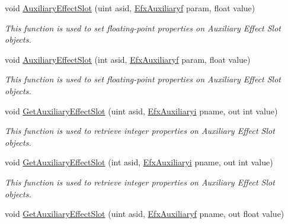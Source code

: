 \begin{DoxyCompactItemize}
void \hyperlink{class_open_t_k_1_1_audio_1_1_open_a_l_1_1_effects_extension_acb92406a943db3db93148e5473838d1c}{Auxiliary\-Effect\-Slot} (uint asid, \hyperlink{namespace_open_t_k_1_1_audio_1_1_open_a_l_ad4eb76e6214aa11619cd342b8ab6acbd}{Efx\-Auxiliaryf} param, float value)
\begin{DoxyCompactList}\small\item\em This function is used to set floating-\/point properties on Auxiliary Effect Slot objects.\end{DoxyCompactList}\item 
void \hyperlink{class_open_t_k_1_1_audio_1_1_open_a_l_1_1_effects_extension_ad5a5e5a6157209de8bed4682de7fd9a2}{Auxiliary\-Effect\-Slot} (int asid, \hyperlink{namespace_open_t_k_1_1_audio_1_1_open_a_l_ad4eb76e6214aa11619cd342b8ab6acbd}{Efx\-Auxiliaryf} param, float value)
\begin{DoxyCompactList}\small\item\em This function is used to set floating-\/point properties on Auxiliary Effect Slot objects.\end{DoxyCompactList}\item 
void \hyperlink{class_open_t_k_1_1_audio_1_1_open_a_l_1_1_effects_extension_ab2a55e2efd22acdee604fdc52fc36ff9}{Get\-Auxiliary\-Effect\-Slot} (uint asid, \hyperlink{namespace_open_t_k_1_1_audio_1_1_open_a_l_a94243a598006983d92449b374a5b60cc}{Efx\-Auxiliaryi} pname, out int value)
\begin{DoxyCompactList}\small\item\em This function is used to retrieve integer properties on Auxiliary Effect Slot objects.\end{DoxyCompactList}\item 
void \hyperlink{class_open_t_k_1_1_audio_1_1_open_a_l_1_1_effects_extension_a0689a310d5097e82e4cb368c73d255e3}{Get\-Auxiliary\-Effect\-Slot} (int asid, \hyperlink{namespace_open_t_k_1_1_audio_1_1_open_a_l_a94243a598006983d92449b374a5b60cc}{Efx\-Auxiliaryi} pname, out int value)
\begin{DoxyCompactList}\small\item\em This function is used to retrieve integer properties on Auxiliary Effect Slot objects.\end{DoxyCompactList}\item 
void \hyperlink{class_open_t_k_1_1_audio_1_1_open_a_l_1_1_effects_extension_a79da0470f0f7b2bf6eaaea3619c0f41c}{Get\-Auxiliary\-Effect\-Slot} (uint asid, \hyperlink{namespace_open_t_k_1_1_audio_1_1_open_a_l_ad4eb76e6214aa11619cd342b8ab6acbd}{Efx\-Auxiliaryf} pname, out float value)

\end{DoxyCompactItemize}
